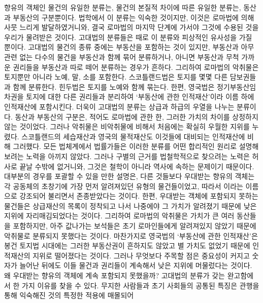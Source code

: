 향유의 객체인 물건의 유일한  분류는,
물건의 본질적 차이에 따른 유일한 분류는,
동산과 부동산의 구분뿐이다.
법학에서 이 분류는 익숙한 것이지만,
이것은 로마법에 의해 사뭇 느리게 발달하였거니와,
결국 로마법의 마지막 단계에 가서야 그것에 수용된 것을
우리가 물려받은 것이다.
고대법의 분류들은 때로 이 분류와 피상적인 유사성을 가질 뿐이다.
고대법의 물건의 종류 중에는 부동산을 포함하는 것이 있지만,
부동산과 아무 관련 없는 다수의 물건을
부동산과 함께
묶어 분류하거나,
아니면
부동산과 무척 가까운 권리들을 부동산과 따로 떼어 분류하는 경우가 흔하다.
그리하여
로마법의 악취물은 토지뿐만 아니라 노예, 말, 소를 포함한다.
스코틀랜드법은 토지를 몇몇 다른 담보권들과 함께 분류한다.
힌두법은 토지를 노예와 함께 묶는다.
한편, 영국법은 정기부동산임차권을
토지에 대한 다른 권리들과 분리하여
`부동산에 관한 인적재산'이라 이름 하에
인적재산에 포함시킨다.
더욱이 고대법의 분류는 상급과 하급의 우열을 나누는 분류이다.
동산과 부동산의 구분은,
적어도 로마법에 관한 한,
그러한 가치의 차이를 상정하지 않는 것이었다.
그러나
악취물은 비악취물에 비해서 처음에는 확실히 우월한 지위를 누렸다.
스코틀랜드의 세습재산과
영국의 물적재산도 이것들에 대비되는 인적재산에 비해 그러했다.
모든 법체계에서 법률가들은
이러한 분류를 어떤 합리적인 원리로 설명해보려는
노력을 아끼지 않았다.
그러나 구별의 근거를 법철학적으로 찾으려는 노력은 허사로 끝날 수밖에
없거니와,
그것은 철학이 아니라 역사에 속하는 문제이기 때문이다.
대부분의 경우를 포괄할 수 있을 만한 설명은,
다른 것들보다 우대받는 향유의 객체는
각 공동체의 초창기에 가장 먼저 알려져있던 유형의 물건들이었고,
따라서 이라는 이름으로 강조되어
불리면서 존종받았다는 것이다.
한편, 우대받는 객체에 포함되지 못하는 물건들은
상급재산의 목록이 정착되고 나서 나중에야
그 가치가 알려졌기 때문에 낮은 지위에 자리매김되었다는 것이다.
그리하여 로마법의 악취물은 가치가 큰 여러 동산들을 포함하지만,
아주 값나가는 보석들은
초기 로마인들에게 알려져있지 않았기 때문에
악취물로 분류되지 못했다는 것이다.
마찬가지로 영국법의 `부동산에 관한 인적재산'은
봉건 토지법 시대에는 그러한 부동산권이 흔하지도 않았고
별 가치도 없었기 때문에 인적재산의 지위로 떨어졌다는 것이다.
그러나
무엇보다 주목할 점은
중요성이 커지고 숫자가 늘어난 뒤에도
이들 물건과 권리들이 계속해서 낮은 지위에 머물렀다는 것이다.
왜 우대받는 향유의 객체에 계속 포함되지 못했을까?
고대법의 분류가 갖는 완고함에서
한 가지 이유를
찾을 수 있다.
무지한 사람들과 초기 사회들의 공통된 특징은
관행을 통해 익숙해진 것의 특정한 적용에 매몰되어
